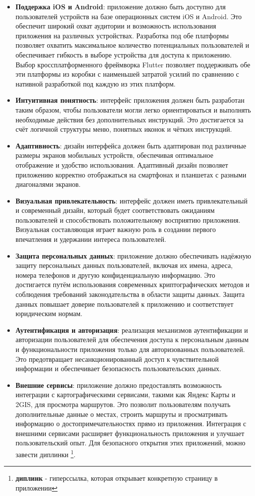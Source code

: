 \begin{itemize}
    \item \textbf{Поддержка iOS и Android}: приложение должно быть доступно для пользователей устройств на базе операционных систем iOS и Android. Это обеспечит широкий охват аудитории и возможность использования приложения на различных устройствах. Разработка под обе платформы позволяет охватить максимальное количество потенциальных пользователей и обеспечивает гибкость в выборе устройства для доступа к приложению. Выбор кроссплатформенного фреймворка Flutter позволяет поддерживать обе эти платформы из коробки с наименьшей затратой усилий по сравнению с нативной разработкой под каждую из этих платформ.
    \item \textbf{Интуитивная понятность}: интерфейс приложения должен быть разработан таким образом, чтобы пользователи могли легко ориентироваться и выполнять необходимые действия без дополнительных инструкций. Это достигается за счёт логичной структуры меню, понятных иконок и чётких инструкций.
    \item \textbf{Адаптивность}: дизайн интерфейса должен быть адаптирован под различные размеры экранов мобильных устройств, обеспечивая оптимальное отображение и удобство использования. Адаптивный дизайн позволяет приложению корректно отображаться на смартфонах и планшетах с разными диагоналями экранов.
    \item \textbf{Визуальная привлекательность}: интерфейс должен иметь привлекательный и современный дизайн, который будет соответствовать ожиданиям пользователей и способствовать положительному восприятию приложения. Визуальная составляющая играет важную роль в создании первого впечатления и удержании интереса пользователей.
    \item \textbf{Защита персональных данных}: приложение должно обеспечивать надёжную защиту персональных данных пользователей, включая их имена, адреса, номера телефонов и другую конфиденциальную информацию. Это достигается путём использования современных криптографических методов и соблюдения требований законодательства в области защиты данных. Защита данных повышает доверие пользователей к приложению и соответствует юридическим нормам.
    \item \textbf{Аутентификация и авторизация}: реализация механизмов аутентификации и авторизации пользователей для обеспечения доступа к персональным данным и функциональности приложения только для авторизованных пользователей. Это предотвращает несанкционированный доступ к чувствительной информации и обеспечивает безопасность пользовательских данных.
    \item \textbf{Внешние сервисы}: приложение должно предоставлять возможность интеграции с картографическими сервисами, такими как Яндекс Карты и 2GIS, для просмотра маршрутов. Это позволит пользователям получать дополнительные данные о местах, строить маршруты и просматривать информацию о достопримечательностях прямо из приложения. Интеграция с внешними сервисами расширяет функциональность приложения и улучшает пользовательский опыт. Для безопасного открытия этих приложений, можно завести диплинки \footnote[0]{\textbf{диплинк} - гиперссылка, которая открывает конкретную страницу в приложении}.
\end{itemize}

